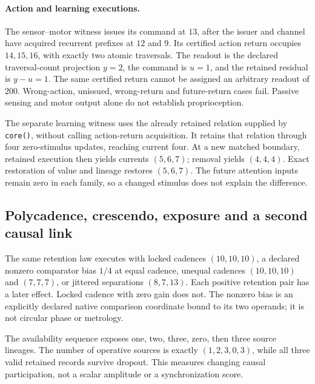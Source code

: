 
\paragraph{Action and learning executions.}
The sensor--motor witness issues its command at \(13\), after the issuer and
channel have acquired recurrent prefixes at \(12\) and \(9\). Its certified
action return occupies \(14,15,16\), with exactly two atomic traversals.
The readout is the declared traversal-count projection \(y=2\), the command
is \(u=1\), and the retained residual is \(y-u=1\). The same certified return
cannot be assigned an arbitrary readout of \(200\). Wrong-action, unissued,
wrong-return and future-return cases fail. Passive sensing and motor output
alone do not establish proprioception.

The separate learning witness uses the already retained relation supplied by
\texttt{core()}, without calling action-return acquisition. It retains that
relation through four zero-stimulus updates, reaching current four. At a new matched boundary, retained execution
then yields currents \((5,6,7)\); removal yields \((4,4,4)\). Exact restoration
of value and lineage restores \((5,6,7)\). The future attention inputs remain
zero in each family, so a changed stimulus does not explain the difference.

\subsection{Polycadence, crescendo, exposure and a second causal link}
\label{sec:m2-crescendo}
The same retention law executes with locked cadences \((10,10,10)\), a declared
nonzero comparator bias \(1/4\) at equal cadence, unequal cadences
\((10,10,10)\) and \((7,7,7)\), or jittered separations \((8,7,13)\).
Each positive retention pair has a later effect. Locked cadence with zero
gain does not. The nonzero bias is an explicitly declared native comparison
coordinate bound to its two operands; it is not circular phase or metrology.

The availability sequence exposes one, two, three, zero, then three source
lineages. The number of operative sources is exactly \((1,2,3,0,3)\), while
all three valid retained records survive dropout. This measures changing
causal participation, not a scalar amplitude or a synchronization score.

